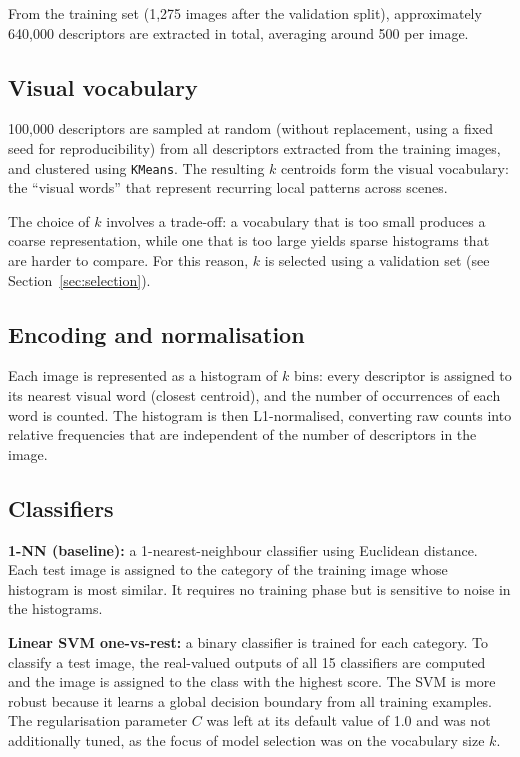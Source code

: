 \documentclass[11pt, a4paper]{article}
\begin{document}
From the training set (1,275 images after the validation split),
approximately 640,000 descriptors are extracted in total, averaging
around 500 per image.

\subsection{Visual vocabulary}

100,000 descriptors are sampled at random (without replacement, using a
fixed seed for reproducibility) from all descriptors extracted from the
training images, and clustered using \texttt{KMeans}. The resulting $k$
centroids form the visual vocabulary: the ``visual words'' that
represent recurring local patterns across scenes.

The choice of $k$ involves a trade-off: a vocabulary that is too small
produces a coarse representation, while one that is too large yields
sparse histograms that are harder to compare. For this reason, $k$ is
selected using a validation set (see Section~\ref{sec:selection}).

\subsection{Encoding and normalisation}

Each image is represented as a histogram of $k$ bins: every descriptor
is assigned to its nearest visual word (closest centroid), and the
number of occurrences of each word is counted. The histogram is then
L1-normalised, converting raw counts into relative frequencies that are
independent of the number of descriptors in the image.

\subsection{Classifiers}

\textbf{1-NN (baseline):} a 1-nearest-neighbour classifier using
Euclidean distance. Each test image is assigned to the category of the
training image whose histogram is most similar. It requires no training
phase but is sensitive to noise in the histograms.

\textbf{Linear SVM one-vs-rest:} a binary classifier is trained for
each category. To classify a test image, the real-valued outputs of all
15 classifiers are computed and the image is assigned to the class with
the highest score. The SVM is more robust because it learns a global
decision boundary from all training examples. The regularisation
parameter $C$ was left at its default value of 1.0 and was not
additionally tuned, as the focus of model selection was on the
vocabulary size $k$.
\end{document}
